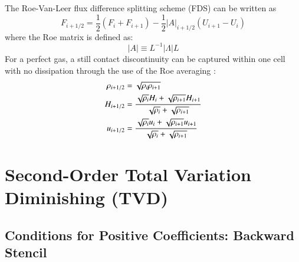 \documentclass{warpdoc}
\newcommand{\alb}{\vspace{0.1cm}\\} %
\begin{document}
The Roe-Van-Leer flux difference splitting scheme (FDS) can be written as
%
\begin{equation}
F_{i+1/2}=\frac{1}{2} \left( F_i + F_{i+1}\right) - \frac{1}{2}|A|_{i+1/2}\left(U_{i+1}-U_i \right) 
\end{equation}
%
where the Roe matrix is defined as:
%
\begin{equation}
|A|\equiv L^{-1} |\Lambda| L
\end{equation}
%
For a perfect gas, a still contact discontinuity can be captured within one cell with no dissipation through the use of the Roe averaging \cite{jcp:1981:roe}:
%
\begin{align}
\rho_{i+1/2} &= \sqrt{\rho_i \rho_{i+1}} \alb
H_{i+1/2} &= \frac{\sqrt{\rho_i}H_i + \sqrt{\rho_{i+1}}H_{i+1}}{\sqrt{\rho_i}+\sqrt{\rho_{i+1}}} \alb
u_{i+1/2} &= \frac{\sqrt{\rho_i}u_i + \sqrt{\rho_{i+1}}u_{i+1}}{\sqrt{\rho_i}+\sqrt{\rho_{i+1}}}
\end{align}
%



\section{Second-Order Total Variation Diminishing (TVD)}


\subsection{Conditions for Positive Coefficients: Backward Stencil}
\end{document}
